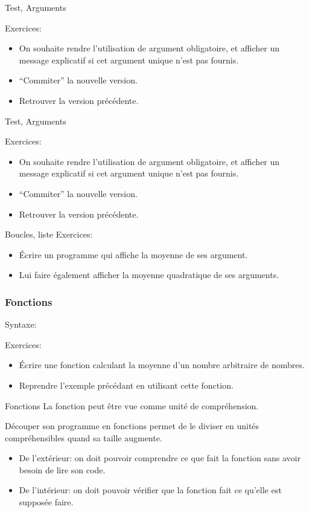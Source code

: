 \documentclass{beamer}
\begin{document}
\begin{frame}{Test, Arguments}
  
  Exercices:
  \begin{itemize}
  \item On souhaite rendre l'utilisation de argument obligatoire, et afficher un message explicatif si cet argument unique n'est pas fournis.
  \item ``Commiter''  la nouvelle version.
  \item Retrouver la version précédente.
  \end{itemize}
\end{frame}

\begin{frame}{Test, Arguments}
  
  Exercices:
  \begin{itemize}
  \item On souhaite rendre l'utilisation de argument obligatoire, et afficher un message explicatif si cet argument unique n'est pas fournis.
  \item ``Commiter''  la nouvelle version.
  \item Retrouver la version précédente.
  \end{itemize}
\end{frame}

\begin{frame}{Boucles, liste}
  Exercices:
  \begin{itemize}
  \item Écrire un programme qui affiche la moyenne de ses argument.
  \item Lui faire également afficher la moyenne quadratique de ses arguments.
  \end{itemize}
\end{frame}

\begin{frame}[fragile]\frametitle{Fonctions}
  Syntaxe:
  \fbox{}

  Exercices:
  \begin{itemize}
  \item Écrire une fonction calculant la moyenne d'un nombre arbitraire de nombres.
  \item Reprendre l'exemple précédant en utilisant cette fonction.
  \end{itemize}
\end{frame}

\begin{frame}{Fonctions}
  La fonction peut être vue comme unité de compréhension.
  
  Découper son programme en fonctions permet de le diviser en unités compréhensibles quand sa taille augmente.

  \begin{itemize}
  \item De l'extérieur: on doit pouvoir comprendre ce que fait la fonction sans avoir besoin de lire son code.
  \item De l'intérieur: on doit pouvoir vérifier que la fonction fait ce qu'elle est supposée faire.
  \end{itemize}
\end{frame}
\end{document}
